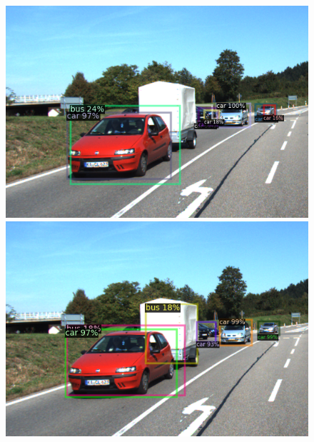 \documentclass{article}
\begin{document}
\begin{figure}[h!]
  \centering
  \begin{minipage}{0.33\textwidth}
  \includegraphics[trim={3cm 0cm 0cm 0cm}, clip, height=0.17\textheight]{./../../final_results/Kitti/000128_1shot.png}
  \end{minipage}
  \begin{minipage}{0.33\textwidth}
  \includegraphics[trim={3cm 0cm 0cm 0cm}, clip, height=0.17\textheight]{./../../final_results/Kitti/000128_5shot.png}
  \end{minipage}
  \begin{minipage}{0.31\textwidth}

\end{minipage}
\end{figure}
\end{document}
